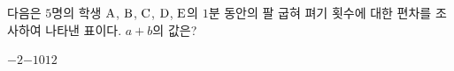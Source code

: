 다음은 $5$명의 학생 $\mathrm{A}$, $\mathrm{B}$, $\mathrm{C}$, $\mathrm{D}$, $\mathrm{E}$의 $1$분 동안의 팔 굽혀 펴기 횟수에 대한 편차를 조사하여 나타낸 표이다. $a+b$의 값은?
\par\smallskip\begin{center}\resizebox{\ifdim\width>\linewidth\linewidth\else\width\fi}{!}{}\end{center}
\begin{choices32}{$-2$}{$-1$}{$0$}{$1$}{$2$}\end{choices32}
